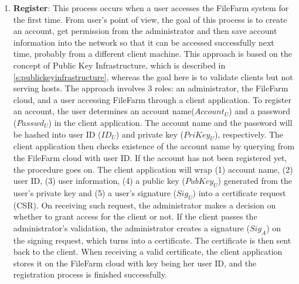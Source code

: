 \begin{enumerate}
  \item \textbf{Register}: This process occurs when a user accesses the FileFarm system for the first time. From user's point of view, the goal of this process is to create an account, get permission from the administrator and then save account information into the network so that it can be accessed successfully next time, probably from a different client machine. This approach is based on the concept of Public Key Infrastructure, which is described in \ref{s:publickeyinfrastructure}, whereas the goal here is to validate clients but not serving hosts. The approach involves 3 roles: an administrator, the FileFarm cloud, and a user accessing FileFarm through a client application. To register an account, the user determines an account name($Account_{U}$) and a password ($Passwd_{U}$) in the client application. The account name and the password will be hashed into user ID ($ID_{U}$) and private key ($PriKey_{U}$), respectively. The client application then checks existence of the account name by querying from the FileFarm cloud with user ID. If the account has not been registered yet, the procedure goes on. The client application will wrap (1) account name, (2) user ID, (3) user information, (4) a public key ($PubKey_{U}$) generated from the user's private key and (5) a user's signature ($Sig_{U}$) into a certificate request (CSR). On receiving such request, the administrator makes a decision on whether to grant access for the client or not. If the client passes the administrator's validation, the administrator creates a signature ($Sig_{A}$) on the signing request, which turns into a certificate. The certificate is then sent back to the client. When receiving a valid certificate, the client application stores it on the FileFarm cloud with key being her user ID, and the registration process is finished successfully.


\end{enumerate}
